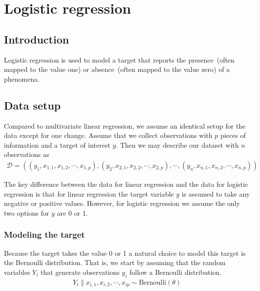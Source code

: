 \chapter{Logistic regression}
\hspace{1mm}

\section{Introduction}\label{intro}

Logistic regression is used to model a target that reports the presence~(often mapped to the value one) or absence~(often mapped to the value zero) of a phenomena.


\section{Data setup}

Compared to multivariate linear regression, we assume an identical setup for the data except for one change. 
Assume that we collect observations with $p$ pieces of information and a target of interest $y$. 
Then we may describe our dataset with $n$ observations as 
\begin{align}
    \mathcal{D} = \left( (y_{1}, x_{1,1}, x_{1,2}, \cdots, x_{1,p}), (y_{2}, x_{2,1}, x_{2,2}, \cdots, x_{2,p}), \cdots, (y_{n}, x_{n,1}, x_{n,2}, \cdots, x_{n,p})  \right)
\end{align}

The key difference between the data for linear regression and the data for logistic regression is that for linear regression the target variable $y$ is assumed to take any negative or positive values.
However, for logistic regression we assume the only two options for $y$ are 0 or 1. 

\subsection{Modeling the target}

Because the target takes the value 0 or 1 a natural choice to model this target is the Bernoulli distribution.
That is, we start by assuming that the random variables $Y_{i}$ that generate observations $y_{i}$ follow a Bernoulli distribution.
\begin{align}
    Y_{i} \| x_{i,1},  x_{i,2}, \cdots, x_{ip} \sim \text{Bernoulli}(\theta)  
\end{align}


